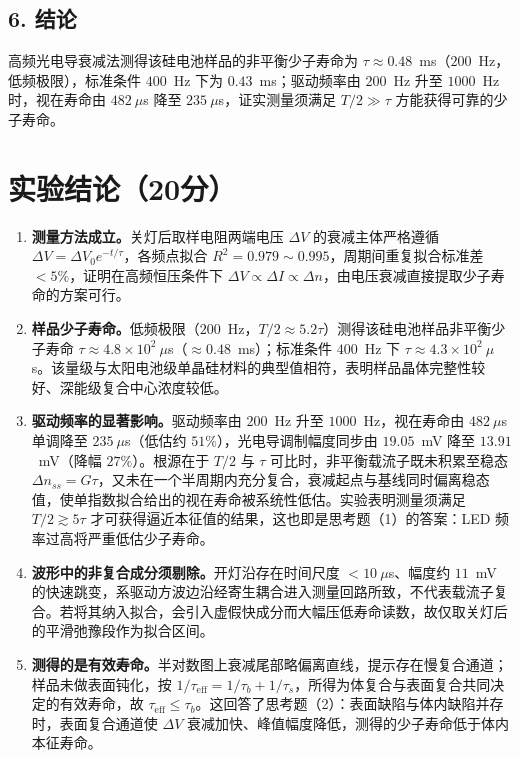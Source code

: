 \documentclass[12pt,a4paper]{ctexart}
\begin{document}
\subsection*{6. 结论}
高频光电导衰减法测得该硅电池样品的非平衡少子寿命为 $\tau\approx0.48$~ms（$200$~Hz，低频极限），标准条件 $400$~Hz 下为 $0.43$~ms；驱动频率由 $200$~Hz 升至 $1000$~Hz 时，视在寿命由 $482~\mu$s 降至 $235~\mu$s，证实测量须满足 $T/2\gg\tau$ 方能获得可靠的少子寿命。

\section*{实验结论（20分）}

\begin{enumerate}
    \item \textbf{测量方法成立。}关灯后取样电阻两端电压 $\Delta V$ 的衰减主体严格遵循 $\Delta V=\Delta V_0e^{-t/\tau}$，各频点拟合 $R^2=0.979\sim0.995$，周期间重复拟合标准差 $<5\%$，证明在高频恒压条件下 $\Delta V\propto\Delta I\propto\Delta n$，由电压衰减直接提取少子寿命的方案可行。

    \item \textbf{样品少子寿命。}低频极限（$200$~Hz，$T/2\approx5.2\tau$）测得该硅电池样品非平衡少子寿命 $\tau\approx4.8\times10^{2}~\mu$s（$\approx0.48$~ms）；标准条件 $400$~Hz 下 $\tau\approx4.3\times10^{2}~\mu$s。该量级与太阳电池级单晶硅材料的典型值相符，表明样品晶体完整性较好、深能级复合中心浓度较低。

    \item \textbf{驱动频率的显著影响。}驱动频率由 $200$~Hz 升至 $1000$~Hz，视在寿命由 $482~\mu$s 单调降至 $235~\mu$s（低估约 $51\%$），光电导调制幅度同步由 $19.05$~mV 降至 $13.91$~mV（降幅 $27\%$）。根源在于 $T/2$ 与 $\tau$ 可比时，非平衡载流子既未积累至稳态 $\Delta n_{ss}=G\tau$，又未在一个半周期内充分复合，衰减起点与基线同时偏离稳态值，使单指数拟合给出的视在寿命被系统性低估。实验表明测量须满足 $T/2\gtrsim5\tau$ 才可获得逼近本征值的结果，这也即是思考题（1）的答案：LED 频率过高将严重低估少子寿命。

    \item \textbf{波形中的非复合成分须剔除。}开灯沿存在时间尺度 $<10~\mu$s、幅度约 $11$~mV 的快速跳变，系驱动方波边沿经寄生耦合进入测量回路所致，不代表载流子复合。若将其纳入拟合，会引入虚假快成分而大幅压低寿命读数，故仅取关灯后的平滑弛豫段作为拟合区间。

    \item \textbf{测得的是有效寿命。}半对数图上衰减尾部略偏离直线，提示存在慢复合通道；样品未做表面钝化，按 $1/\tau_{\mathrm{eff}}=1/\tau_b+1/\tau_s$，所得为体复合与表面复合共同决定的有效寿命，故 $\tau_{\mathrm{eff}}\leq\tau_b$。这回答了思考题（2）：表面缺陷与体内缺陷并存时，表面复合通道使 $\Delta V$ 衰减加快、峰值幅度降低，测得的少子寿命低于体内本征寿命。
\end{enumerate}
\end{document}
